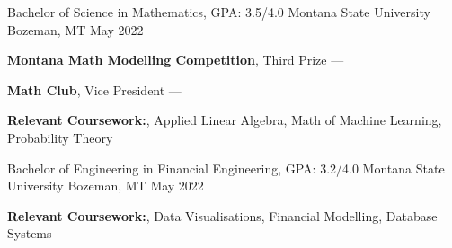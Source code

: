 
\begin{cventries}
  \cventry
    {Bachelor of Science in Mathematics, GPA: 3.5/4.0} %
    {Montana State University} %
    {Bozeman, MT} %
    {May 2022} %
    {
      \begin{cvitems} %
        \item {\textbf{Montana Math Modelling Competition}, Third Prize --- }
        \vspace{0.5mm}
        \item {\textbf{Math Club}, Vice President --- }
        \vspace{0.5mm}
        \item {\textbf{Relevant Coursework:}, Applied Linear Algebra, Math of Machine Learning, Probability Theory \entrydatestyle{}}
      \end{cvitems}
    }
  \cventry
    {Bachelor of Engineering in Financial Engineering, GPA: 3.2/4.0} %
    {Montana State University} %
    {Bozeman, MT} %
    {May 2022} %
    {
      \begin{cvitems} %
        \item {\textbf{Relevant Coursework:}, Data Visualisations, Financial Modelling, Database Systems \entrydatestyle{}}
        \vspace{0.5mm}
      \end{cvitems}
    }
    
    
      

\end{cventries}
